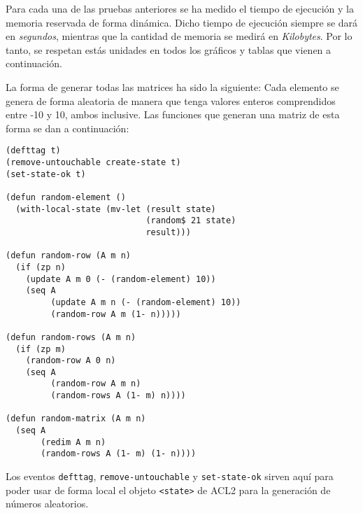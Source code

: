 \documentclass[a4paper,10pt]{article}
\begin{document}
\par \vspace{10pt}

Para cada una de las pruebas anteriores se ha medido el tiempo de ejecución y la memoria reservada de forma dinámica. Dicho tiempo de ejecución siempre se dará en \emph{segundos}, mientras que la cantidad de memoria se medirá en \emph{Kilobytes}. Por lo tanto, se respetan estás unidades en todos los gráficos y tablas que vienen a continuación.

\par \vspace{10pt}

La forma de generar todas las matrices ha sido la siguiente: Cada elemento se genera de forma aleatoria de manera que tenga valores enteros comprendidos entre -10 y 10, ambos inclusive. Las funciones que generan una matriz de esta forma se dan a continuación:

\par \vspace{10pt}

\begin{lstlisting}[language=clips]
(defttag t)
(remove-untouchable create-state t)
(set-state-ok t)

(defun random-element ()
  (with-local-state (mv-let (result state)
                            (random$ 21 state)
                            result)))
														
(defun random-row (A m n)
  (if (zp n)
    (update A m 0 (- (random-element) 10))
    (seq A
         (update A m n (- (random-element) 10))
         (random-row A m (1- n)))))

(defun random-rows (A m n)
  (if (zp m)
    (random-row A 0 n)
    (seq A
         (random-row A m n)
         (random-rows A (1- m) n))))

(defun random-matrix (A m n)
  (seq A
       (redim A m n)
       (random-rows A (1- m) (1- n))))
\end{lstlisting}

\par \vspace{10pt}

Los eventos \texttt{defttag}, \texttt{remove-untouchable} y \texttt{set-state-ok} sirven aquí para poder usar de forma local el objeto \texttt{<state>} de ACL2 para la generación de números aleatorios.

\par \vspace{10pt}
\end{document}
